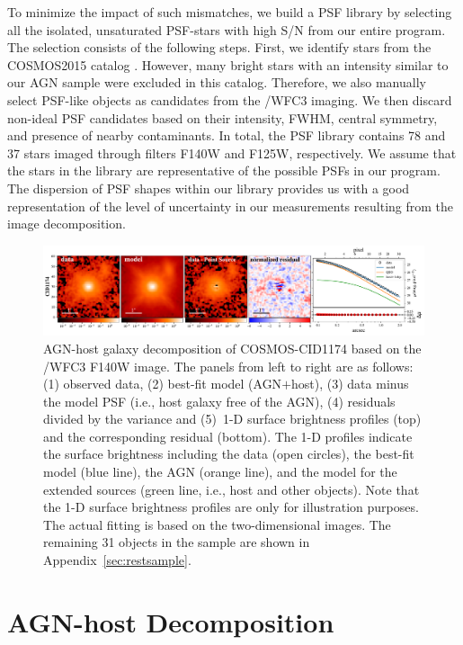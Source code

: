 \documentclass[apj]{emulateapj}
\begin{document}
To minimize the impact of such mismatches, we build a PSF library by selecting all the isolated, unsaturated PSF-stars with high S/N from our entire program. The selection consists of the following steps. First, we identify stars from the COSMOS2015 catalog \citep{Laigle2016}. However, many bright stars with an intensity similar to our AGN sample were excluded in this catalog. Therefore, we also manually select PSF-like objects as candidates from the \hst/WFC3 imaging. We then discard non-ideal PSF candidates based on their intensity, FWHM, central symmetry, and presence of nearby contaminants. In total, the PSF library contains 78 and 37 stars imaged through filters F140W and F125W, respectively. We assume that the stars in the library are representative of the possible PSFs in our program. The dispersion of PSF shapes within our library provides us with a good representation of the level of uncertainty in our measurements resulting from the image decomposition.

\begin{figure}
\centering
{
\includegraphics[height=0.25\textwidth]{fig/best_fit_CID1174_SB_profile.pdf}
\caption{\label{fig:AGN_decomp} AGN-host galaxy decomposition of COSMOS-CID1174 based on the \hst/WFC3 F140W image. The panels from left to right are as follows: (1) observed data, (2) best-fit model (AGN$+$host), (3) data minus the model PSF (i.e., host galaxy free of the AGN), (4) residuals divided by the variance and (5)~1-D surface brightness profiles (top) and the corresponding residual (bottom). The 1-D profiles indicate the surface brightness including the data (open circles), the best-fit model (blue line), the AGN (orange line), and the model for the extended sources (green line, i.e., host and other objects). Note that the 1-D surface brightness profiles are only for illustration purposes. The actual fitting is based on the two-dimensional images. The remaining 31 objects in the sample are shown in Appendix~\ref{sec:restsample}.
}}
\end{figure} 

\section{AGN-host Decomposition}
\label{sec:analysis}
\end{document}
